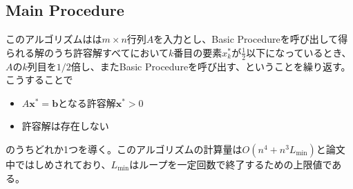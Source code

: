 \subsection{Main Procedure}
このアルゴリズムはは$m \times n$行列$A$を入力とし、Basic Procedureを呼び出して得られる解のうち許容解すべてにおいて$k$番目の要素$x_k^*$が$\frac{1}{2}$以下になっているとき、$A$の$k$列目を$1 / 2$倍し、またBasic Procedureを呼び出す、ということを繰り返す。こうすることで
\begin{itemize}
  \item $A\mathbf{x}^*=\mathbf{b}$となる許容解$\mathbf{x}^* > 0$
  \item 許容解は存在しない
\end{itemize}
のうちどれか1つを導く。このアルゴリズムの計算量は$O\left(n^4 + n^3 L_{\text{min}}\right)$と論文中ではしめされており、$L_{\text{min}}$はループを一定回数で終了するための上限値である。
